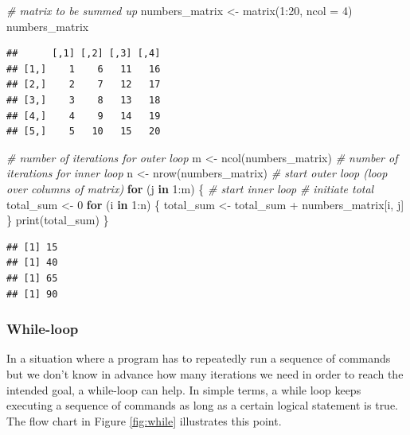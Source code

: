 \documentclass[
  12pt,
]{style/krantz}
\newenvironment{Shaded}{\begin{snugshade}}{\end{snugshade}}
\newcommand{\AttributeTok}[1]{\textcolor[rgb]{0.77,0.63,0.00}{#1}}
\newcommand{\CommentTok}[1]{\textcolor[rgb]{0.56,0.35,0.01}{\textit{#1}}}
\newcommand{\ControlFlowTok}[1]{\textcolor[rgb]{0.13,0.29,0.53}{\textbf{#1}}}
\newcommand{\DecValTok}[1]{\textcolor[rgb]{0.00,0.00,0.81}{#1}}
\newcommand{\FunctionTok}[1]{\textcolor[rgb]{0.00,0.00,0.00}{#1}}
\newcommand{\NormalTok}[1]{#1}
\newcommand{\OtherTok}[1]{\textcolor[rgb]{0.56,0.35,0.01}{#1}}
\newcommand{\SpecialCharTok}[1]{\textcolor[rgb]{0.00,0.00,0.00}{#1}}
\begin{document}
\begin{Shaded}
\begin{Highlighting}[]
\CommentTok{\# matrix to be summed up}
\NormalTok{numbers\_matrix }\OtherTok{\textless{}{-}} \FunctionTok{matrix}\NormalTok{(}\DecValTok{1}\SpecialCharTok{:}\DecValTok{20}\NormalTok{, }\AttributeTok{ncol =} \DecValTok{4}\NormalTok{)}
\NormalTok{numbers\_matrix}
\end{Highlighting}
\end{Shaded}

\begin{verbatim}
##      [,1] [,2] [,3] [,4]
## [1,]    1    6   11   16
## [2,]    2    7   12   17
## [3,]    3    8   13   18
## [4,]    4    9   14   19
## [5,]    5   10   15   20
\end{verbatim}

\begin{Shaded}
\begin{Highlighting}[]
\CommentTok{\# number of iterations for outer loop}
\NormalTok{m }\OtherTok{\textless{}{-}} \FunctionTok{ncol}\NormalTok{(numbers\_matrix)}
\CommentTok{\# number of iterations for inner loop}
\NormalTok{n }\OtherTok{\textless{}{-}} \FunctionTok{nrow}\NormalTok{(numbers\_matrix)}
\CommentTok{\# start outer loop (loop over columns of matrix)}
\ControlFlowTok{for}\NormalTok{ (j }\ControlFlowTok{in} \DecValTok{1}\SpecialCharTok{:}\NormalTok{m) \{}
     \CommentTok{\# start inner loop}
     \CommentTok{\# initiate total}
\NormalTok{     total\_sum }\OtherTok{\textless{}{-}} \DecValTok{0}
     \ControlFlowTok{for}\NormalTok{ (i }\ControlFlowTok{in} \DecValTok{1}\SpecialCharTok{:}\NormalTok{n) \{}
\NormalTok{          total\_sum }\OtherTok{\textless{}{-}}\NormalTok{ total\_sum }\SpecialCharTok{+}\NormalTok{ numbers\_matrix[i, j]}
\NormalTok{          \}}
     \FunctionTok{print}\NormalTok{(total\_sum)}
\NormalTok{     \}}
\end{Highlighting}
\end{Shaded}

\begin{verbatim}
## [1] 15
## [1] 40
## [1] 65
## [1] 90
\end{verbatim}

\hypertarget{while-loop}{%
\subsubsection{While-loop}\label{while-loop}}

In a situation where a program has to repeatedly run a sequence of commands but we don't know in advance how many iterations we need in order to reach the intended goal, a while-loop can help. In simple terms, a while loop keeps executing a sequence of commands as long as a certain logical statement is true. The flow chart in Figure \ref{fig:while} illustrates this point.
\end{document}
